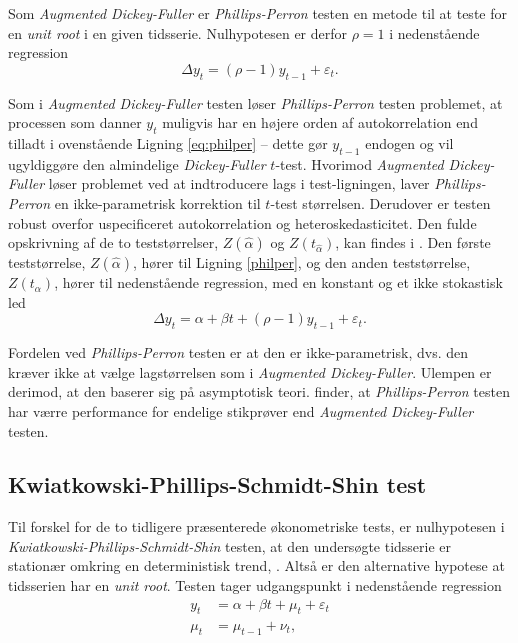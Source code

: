 \documentclass[
  a4paper,
  oneside]{memoir}
\begin{document}
Som \emph{Augmented Dickey-Fuller} er \emph{Phillips-Perron} testen en metode til at teste for en \emph{unit root} i en given tidsserie. Nulhypotesen er derfor \(\rho=1\) i nedenstående regression
\begin{equation}
\Delta y_t = (\rho-1) y_{t-1} + \varepsilon_t.\label{eq:philper}
\end{equation}

Som i \emph{Augmented Dickey-Fuller} testen løser \emph{Phillips-Perron} testen problemet, at processen som danner \(y_t\) muligvis har en højere orden af autokorrelation end tilladt i ovenstående Ligning \eqref{eq:philper} -- dette gør \(y_{t-1}\) endogen og vil ugyldiggøre den almindelige \emph{Dickey-Fuller} \(t\)-test. Hvorimod \emph{Augmented Dickey-Fuller} løser problemet ved at indtroducere lags i test-ligningen, laver \emph{Phillips-Perron} en ikke-parametrisk korrektion til \(t\)-test størrelsen. Derudover er testen robust overfor uspecificeret autokorrelation og heteroskedasticitet. Den fulde opskrivning af de to teststørrelser, \(Z(\hat{\alpha})\) og \(Z(t_{\hat{\alpha}})\), kan findes i \citep{Phillips1988}. Den første teststørrelse, \(Z(\hat{\alpha})\), hører til Ligning \ref{philper}, og den anden teststørrelse, \(Z(t_{\hat{\alpha}})\), hører til nedenstående regression, med en konstant og et ikke stokastisk led
\[\Delta y_t =\alpha + \beta t + (\rho-1) y_{t-1} + \varepsilon_t.\]

Fordelen ved \emph{Phillips-Perron} testen er at den er ikke-parametrisk, dvs. den kræver ikke at vælge lagstørrelsen som i \emph{Augmented Dickey-Fuller}. Ulempen er derimod, at den baserer sig på asymptotisk teori. \citep{Davidson2004} finder, at \emph{Phillips-Perron} testen har værre performance for endelige stikprøver end \emph{Augmented Dickey-Fuller} testen.

\hypertarget{kwiatkowski-phillips-schmidt-shin-test}{%
\subsection{Kwiatkowski-Phillips-Schmidt-Shin test}\label{kwiatkowski-phillips-schmidt-shin-test}}

Til forskel for de to tidligere præsenterede økonometriske tests, er nulhypotesen i \emph{Kwiatkowski-Phillips-Schmidt-Shin} testen, at den undersøgte tidsserie er stationær omkring en deterministisk trend, \citep{Kwiatkowski1992}. Altså er den alternative hypotese at tidsserien har en \emph{unit root}. Testen tager udgangspunkt i nedenstående regression
\begin{align}
y_t&=\alpha+\beta t + \mu_t+\varepsilon_t\\
\mu_t&=\mu_{t-1}+\nu_t,
\end{align}
\end{document}
